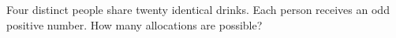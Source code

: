 Four distinct people share twenty identical drinks. Each person receives an odd positive number. How many allocations are possible?
